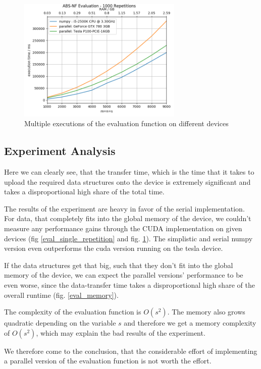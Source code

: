 \begin{figure}[ht]
	\centering
	\includegraphics[width=0.7\textwidth]{img/eval_mult_repetition.png}
	\caption{Multiple executions of the evaluation function on different devices}
	\label{eval_1000}
\end{figure}

\subsection{Experiment Analysis}

Here we can clearly see, that the transfer time, which is the time that it takes to upload the required data structures onto the device is extremely significant and takes a disproportional high share of the total time.

The results of the experiment are heavy in favor of the serial implementation.\\
For data, that completely fits into the global memory of the device, we couldn't measure any performance gains through the CUDA implementation on given devices (fig \ref{eval_single_repetition} and  fig. \ref{eval_1000}). The simplistic and serial numpy version even outperforms the cuda version running on the tesla device.

If the data structures get that big, such that they don't fit into the global memory of the device, we can expect the parallel versions' performance to be even worse, since the data-transfer time takes a disproportional high share of the overall runtime (fig. \ref{eval_memory}).

The complexity of the evaluation function is $O(s^2)$. The memory also grows quadratic depending on the variable $s$ and therefore we get a memory complexity of $O(s^2)$, which may explain the bad results of the experiment.

We therefore come to the conclusion, that the considerable effort of implementing a parallel version of the evaluation function is not worth the effort.

